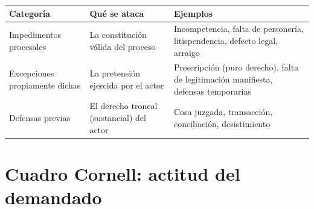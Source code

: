 \documentclass[12pt,oneside]{book}
\begin{document}
\begin{table}[H]
\centering
\begin{tabularx}{\textwidth}{
    >{\raggedright\arraybackslash}p{}
    >{\raggedright\arraybackslash}p{}
    X
}
\toprule
\textbf{Categoría} & \textbf{Qué se ataca} & \textbf{Ejemplos} \\
\midrule
Impedimentos procesales & La constitución válida del proceso & Incompetencia, falta de personería, litispendencia, defecto legal, arraigo \\
Excepciones propiamente dichas & La pretensión ejercida por el actor & Prescripción (puro derecho), falta de legitimación manifiesta, defensas temporarias \\
Defensas previas & El derecho troncal (sustancial) del actor & Cosa juzgada, transacción, conciliación, desistimiento \\
\bottomrule
\end{tabularx}
\end{table}

\section{Cuadro Cornell: actitud del demandado}
\end{document}
